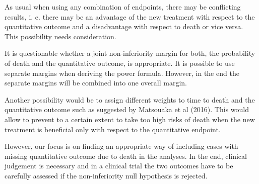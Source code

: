 \documentclass[bimj,fleqn]{w-art}\usepackage[]{graphicx}\usepackage[]{color}
\theoremstyle{plain}
\theoremstyle{definition}
\begin{document}
As usual when using any combination of endpoints, there may be conflicting
results, i. e. there may be an advantage of the new treatment with respect to
the quantitative outcome and a disadvantage with respect to death or vice versa.
This possibility needs consideration.

It is questionable whether a joint non-inferiority margin for both, the
probability of death and the quantitative outcome, is appropriate. It is
possible to use separate margins when deriving the power formula. However, in
the end the separate margins will be combined into one overall margin.

Another possibility would be to assign different weights to time to death and
the quantitative outcome such as suggested by Matsouaka et al (2016). This would
allow to prevent to a certain extent to take too high risks of death when the
new treatment is beneficial only with respect to the quantitative endpoint.

However, our focus is on finding an appropriate way of including cases with
missing quantitative outcome due to death in the analyses. In the end, clinical
judgement is necessary and in a clinical trial the two outcomes have to be
carefully assessed if the non-inferiority null hypothesis is rejected.
\end{document}
